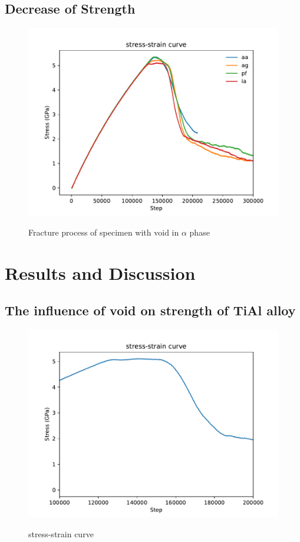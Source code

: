 \documentclass[final,5p,times,twocolumn]{elsarticle}
\begin{document}
\subsection{Decrease of Strength}

\begin{figure}
	\centering
	\includegraphics[width=1\linewidth]{img/allline}
	\label{fig:allline}
	\caption{Fracture process of specimen with void in $\alpha$ phase}
\end{figure}

\section{Results and Discussion}
\subsection{The influence of void on strength of TiAl alloy}

\begin{figure}
	\centering
	\includegraphics[width=1\linewidth]{img/ialine}
	\label{fig:ialine}
	\caption{stress-strain curve}
\end{figure}
\end{document}
